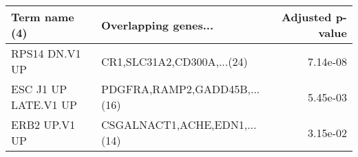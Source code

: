 \begin{tabular}{llr}
\toprule
       Term name (4) &         Overlapping genes... &  Adjusted p-value \\
\midrule
      RPS14 DN.V1 UP &   CR1,SLC31A2,CD300A,...(24) &          7.14e-08 \\
ESC J1 UP LATE.V1 UP & PDGFRA,RAMP2,GADD45B,...(16) &          5.45e-03 \\
       ERB2 UP.V1 UP & CSGALNACT1,ACHE,EDN1,...(14) &          3.15e-02 \\
\bottomrule
\end{tabular}
